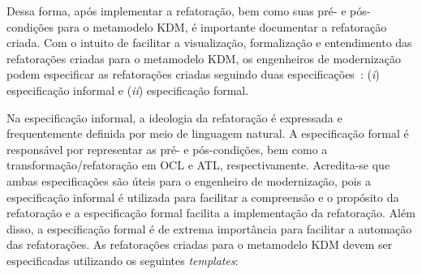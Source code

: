Dessa forma, após implementar a refatoração, bem como suas pré- e pós-condições para o metamodelo KDM, é importante documentar a refatoração criada. Com o intuito de facilitar a visualização, formalização e entendimento das refatorações criadas para o metamodelo KDM, os engenheiros de modernização podem especificar as refatorações criadas seguindo duas especificações~\cite{staron2004implementing}: (\textit{i}) especificação informal e (\textit{ii}) especificação formal. 

Na especificação informal, a ideologia da refatoração é expressada e frequentemente definida por meio de linguagem natural. A especificação formal é responsável por representar as pré- e pós-condições, bem como a transformação/refatoração em OCL e ATL, respectivamente. Acredita-se que ambas especificações são úteis para o engenheiro de modernização, pois a especificação informal é utilizada para facilitar a compreensão e o propósito da refatoração e a especificação formal facilita a implementação da refatoração. Além disso, a especificação formal é de extrema importância para facilitar a automação das refatorações. 
%
%
%
%
As refatorações criadas para o metamodelo KDM devem ser especificadas utilizando os seguintes \textit{templates}:

